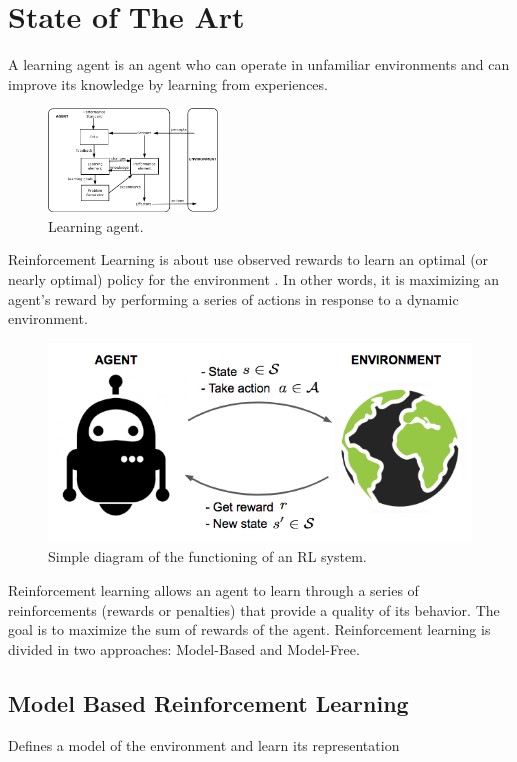 \section{State of The Art}
A learning agent is an agent who can operate in unfamiliar environments and can improve its knowledge by learning from experiences.

\begin{figure}[ht]
    \centering
    \includegraphics[width=0.4\textwidth]{images/IntelligentAgent-Learning.png}
    \caption{Learning agent.}
\end{figure}

Reinforcement Learning is about use observed rewards to learn an optimal (or nearly optimal)
policy for the environment \cite{russell2002artificial}. In other words, it is maximizing an
agent's reward by performing a series of actions in response to a dynamic environment.

\begin{figure}[ht]
    \centering
    \includegraphics[scale=0.4]{images/RL_illustration.png}
    \caption{Simple diagram of the functioning of an RL system.}
    \label{fig:RL_illustration}
\end{figure}

Reinforcement learning allows an agent to learn through a series of reinforcements (rewards or penalties) that provide a quality of its behavior.
The goal is to maximize the sum of rewards of the agent.
Reinforcement learning is divided in two approaches: Model-Based and Model-Free.

\subsection{Model Based Reinforcement Learning}
Defines a model of the environment and learn its representation

